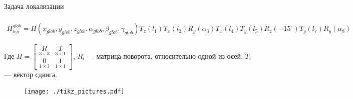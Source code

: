 \begin{frame}[t]{Задача локализации}
\framesubtitle{}
\begin{align}
        H_{leg}^{glob} = H(x_{glob},y_{glob},z_{glob},\alpha_{glob},\beta_{glob},\gamma_{glob})T_z(l_1)T_x(l_2)R_y(\alpha_3)T_x(l_4)T_y(l_5)R_z(-15^{\circ})T_y(l_7)R_y(\alpha_8)
\end{align}

\vspace{-0.3cm}
Где $H = \begin{bmatrix}
    \underset{3 \times 3}{R} & \underset{3 \times 1}{T} \\
    \underset{1 \times 3}{0} & \underset{1 \times 1}{1}
\end{bmatrix}$, $R_i$ --- матрица поворота, относительно одной из осей, $T_i$ --- вектор сдвига.

            
            \vspace{-0.7cm}
            \begin{figure}[H]
        \centering
        \centering\texttt{[image: ./tikz\_pictures.pdf]}
    \end{figure}
\end{frame}


